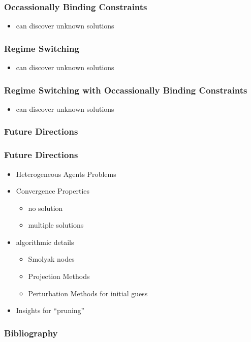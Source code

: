 \documentclass[tikz]{beamer}
\begin{document}
\begin{frame}
\frametitle{Occassionally Binding Constraints}
\begin{itemize}
\item can discover unknown solutions
\end{itemize}



\end{frame}
\begin{frame}
\frametitle{Regime Switching}
\begin{itemize}
\item can discover unknown solutions
\end{itemize}


\end{frame}
\begin{frame}
\frametitle{Regime Switching with Occassionally Binding Constraints}
\begin{itemize}
\item can discover unknown solutions
\end{itemize}

\end{frame}
\begin{frame}
\frametitle{Future Directions}
\end{frame}
\begin{frame}
  \frametitle{Future Directions}
  \begin{itemize}
  \item Heterogeneous Agents Problems
  \item Convergence Properties
    \begin{itemize}
    \item no solution
    \item multiple solutions
    \end{itemize}
\item algorithmic details
  \begin{itemize}
 \item Smolyak nodes
 \item Projection Methods
 \item Perturbation Methods for initial guess
  \end{itemize}
\item Insights for ``pruning''
  \end{itemize}
\end{frame}

\begin{frame}
  \frametitle{Bibliography}
  


\end{frame}
\end{document}
